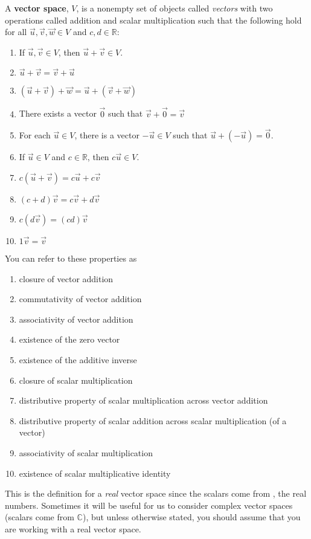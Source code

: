 \begin{definition}
A \textbf{vector space}, $V$, is a nonempty set of objects called \emph{vectors} with two operations called addition and scalar multiplication such that the following hold for all $\vec{u}, \vec{v}, \vec{w} \in V$ and $c,d \in \mathbb{R}$:
\begin{enumerate}
\item If $\vec{u}, \vec{v} \in V$, then $\vec{u}+\vec{v}\in V$.
\item $\vec{u}+\vec{v}=\vec{v}+\vec{u}$
\item $(\vec{u}+\vec{v})+\vec{w}=\vec{u}+(\vec{v}+\vec{w})$
\item There exists a vector $\vec{0}$ such that $\vec{v}+\vec{0}=\vec{v}$
\item For each $\vec{u} \in V$, there is a vector $-\vec{u}\in V$ such that $\vec{u} + (-\vec{u})=\vec{0}$.
\item If $\vec{u} \in V$ and $c \in \mathbb{R}$, then $c\vec{u} \in V$.
\item $c(\vec{u}+\vec{v})=c\vec{u}+c\vec{v}$
\item $(c+d)\vec{v}=c\vec{v}+d\vec{v}$
\item $c(d\vec{v})=(cd)\vec{v}$
\item $1 \vec{v}=\vec{v}$
\end{enumerate}
You can refer to these properties as
\begin{enumerate}
\item closure of vector addition
\item commutativity of vector addition
\item associativity of vector addition
\item existence of the zero vector
\item existence of the additive inverse
\item closure of scalar multiplication
\item distributive property of scalar multiplication across vector addition
\item distributive property of scalar addition across scalar multiplication (of a vector)
\item associativity of scalar multiplication
\item existence of scalar multiplicative identity
\end{enumerate}
\end{definition}
This is the definition for a \emph{real} vector space since the scalars come from \R, the real numbers. Sometimes it will be useful for us to consider complex vector spaces (scalars come from $\mathbb{C}$), but unless otherwise stated, you should assume that you are working with a real vector space.

